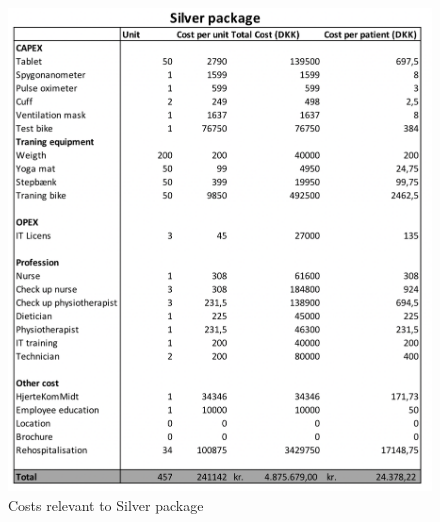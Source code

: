 \begin{figure}[H]
\centering
\includegraphics[width=1\textwidth]{Figure/Silver.png}
\caption{Costs relevant to Silver package}
\label{fig: Silver}
\end{figure} 

